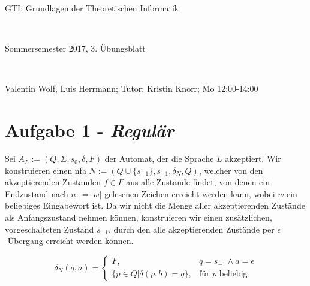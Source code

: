 \documentclass{article}
\begin{document}
	
	\hrulefill
	\begin{center}
		\bfseries %
		\sffamily %
		\begin{huge}
			GTI: Grundlagen der Theoretischen Informatik
		\end{huge}\\
		\begin{Large}
			Sommersemester 2017, 3. Übungsblatt
		\end{Large}\\
		\begin{small}
			Valentin Wolf, Luis Herrmann; Tutor: Kristin Knorr; Mo 12:00-14:00
		\end{small}
		
		\vspace{-10pt}
	\end{center}
	\hrulefill
	
\section*{Aufgabe 1 - \textit{Regulär}}
	
Sei $A_L := (Q, \Sigma, s_0, \delta, F)$ der Automat, der die Sprache $L$ akzeptiert. Wir konstruieren einen nfa $N := (Q \cup \{s_{-1}\}, s_{-1}, \delta_N, Q)$, welcher von den akzeptierenden Zuständen $f\in F$ aus alle Zustände findet, von denen ein Endzustand nach $n: =|w|$ gelesenen Zeichen erreicht werden kann, wobei $w$ ein beliebiges Eingabewort ist. Da wir nicht die Menge aller akzeptierenden Zustände als Anfangszustand nehmen können, konstruieren wir einen zusätzlichen, vorgeschalteten Zustand $s_{-1}$, durch den alle akzeptierenden Zustände per $\epsilon$-Übergang erreicht werden können.

\begin{equation}
	\delta_N(q, a) = \begin{cases}
		F, &q = s_{-1} \land a=\epsilon\\
		\{p \in Q | \delta(p,b) = q\}, &\text{für } p \text{ beliebig}
	\end{cases}
\end{equation}
\end{document}
